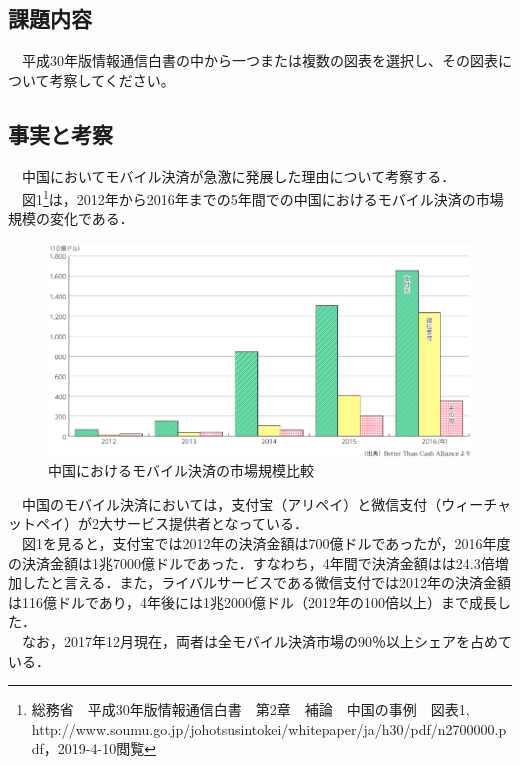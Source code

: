 

\pagestyle{fancy}

\subsection{課題内容}
　平成30年版情報通信白書の中から一つまたは複数の図表を選択し、その図表について考察してください。

\subsection{事実と考察}
　中国においてモバイル決済が急激に発展した理由について考察する．\\
　図1\footnote{総務省　平成30年版情報通信白書　第2章　補論　中国の事例　図表1,\\http://www.soumu.go.jp/johotsusintokei/whitepaper/ja/h30/pdf/n2700000.pdf，2019-4-10閲覧}は，2012年から2016年までの5年間での中国におけるモバイル決済の市場規模の変化である．

\begin{figure}[H]
  \centering
  \includegraphics[width=13cm]{./imgs/1.png}
  \caption{中国におけるモバイル決済の市場規模比較}
\end{figure}

　中国のモバイル決済においては，支付宝（アリペイ）と微信支付（ウィーチャットペイ）が2大サービス提供者となっている．\\
　図1を見ると，支付宝では2012年の決済金額は700億ドルであったが，2016年度の決済金額は1兆7000億ドルであった．すなわち，4年間で決済金額はは24.3倍増加したと言える．また，ライバルサービスである微信支付では2012年の決済金額は116億ドルであり，4年後には1兆2000億ドル（2012年の100倍以上）まで成長した．\\
　なお，2017年12月現在，両者は全モバイル決済市場の90％以上シェアを占めている．\\

